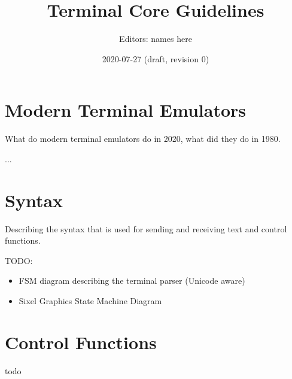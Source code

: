 \documentclass{article}
\title{Terminal Core Guidelines}
\author{Editors: names here}
\date{2020-07-27 (draft, revision 0)}
\begin{document}
\maketitle

\pagebreak

\tableofcontents

\section{Modern Terminal Emulators}

What do modern terminal emulators do in 2020, what did they do in 1980.

...

\section{Syntax}

Describing the syntax that is used for sending and receiving text and control functions.

TODO:

\begin{itemize}
	\item FSM diagram describing the terminal parser (Unicode aware)
	\item Sixel Graphics State Machine Diagram
\end{itemize}

\section{Control Functions}

%


todo
\end{document}
